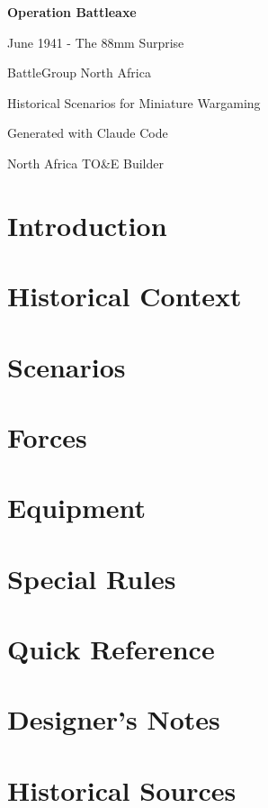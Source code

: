 \documentclass[11pt,letterpaper,twoside]{book}
\begin{document}
\begin{titlepage}
    \centering
    \vspace*{2cm}
    {\Huge\bfseries Operation Battleaxe\par}
    \vspace{1cm}
    {\Large June 1941 - The 88mm Surprise\par}
    \vspace{2cm}
    {\Large BattleGroup North Africa\par}
    {\large Historical Scenarios for Miniature Wargaming\par}
    \vfill
    {\large Generated with Claude Code\par}
    {\large North Africa TO&E Builder\par}
    \vspace{1cm}
\end{titlepage}

\tableofcontents


\chapter{Introduction}

\chapter{Historical Context}

\chapter{Scenarios}

\chapter{Forces}

\chapter{Equipment}

\chapter{Special Rules}

\appendix
\chapter{Quick Reference}

\chapter{Designer's Notes}

\chapter{Historical Sources}
\end{document}
